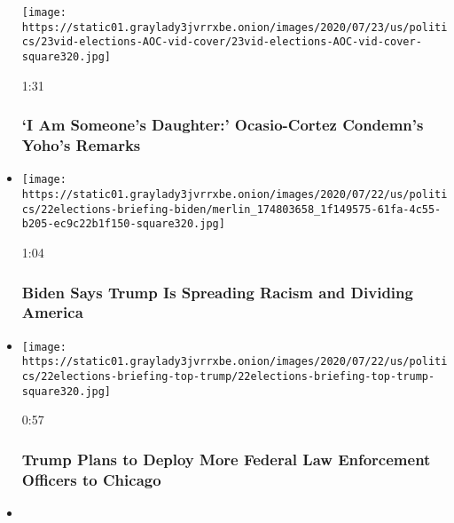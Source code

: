 \begin{itemize}
  \texttt{[image: https://static01.graylady3jvrrxbe.onion/images/2020/07/23/us/politics/23vid-elections-AOC-vid-cover/23vid-elections-AOC-vid-cover-square320.jpg]}

  1:31

  \hypertarget{i-am-someones-daughter-ocasio-cortez-condemns-yohos-remarks}{%
  \subsubsection{`I Am Someone's Daughter:' Ocasio-Cortez Condemn's
  Yoho's
  Remarks}\label{i-am-someones-daughter-ocasio-cortez-condemns-yohos-remarks}}
\item
  \href{https://www.nytimes3xbfgragh.onion/video/us/100000007251300/biden-trump-racist-divide-america.html?action=click\&module=video-series-bar\&region=header\&pgtype=Article\&playlistId=video/us-politics}{}

  \texttt{[image: https://static01.graylady3jvrrxbe.onion/images/2020/07/22/us/politics/22elections-briefing-biden/merlin\_174803658\_1f149575-61fa-4c55-b205-ec9c22b1f150-square320.jpg]}

  1:04

  \hypertarget{biden-says-trump-is-spreading-racism-and-dividing-america}{%
  \subsubsection{Biden Says Trump Is Spreading Racism and Dividing
  America}\label{biden-says-trump-is-spreading-racism-and-dividing-america}}
\item
  \href{https://www.nytimes3xbfgragh.onion/video/us/100000007251764/trump-surge-federal-law-enforcment.html?action=click\&module=video-series-bar\&region=header\&pgtype=Article\&playlistId=video/us-politics}{}

  \texttt{[image: https://static01.graylady3jvrrxbe.onion/images/2020/07/22/us/politics/22elections-briefing-top-trump/22elections-briefing-top-trump-square320.jpg]}

  0:57

  \hypertarget{trump-plans-to-deploy-more-federal-law-enforcement-officers-to-chicago}{%
  \subsubsection{Trump Plans to Deploy More Federal Law Enforcement
  Officers to
  Chicago}\label{trump-plans-to-deploy-more-federal-law-enforcement-officers-to-chicago}}
\item
  \href{https://www.nytimes3xbfgragh.onion/video/us/100000007250230/mcconnell-proposal-relief-package.html?action=click\&module=video-series-bar\&region=header\&pgtype=Article\&playlistId=video/us-politics}{}


\end{itemize}
